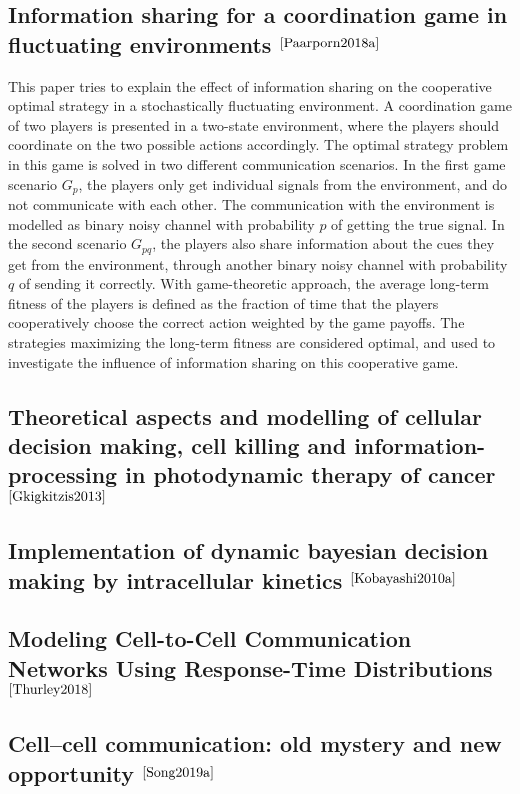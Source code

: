 \documentclass[]{article}
\begin{document}
\subsection{Information sharing for a coordination game in fluctuating environments $ ^{\cite{Paarporn2018a}} $}
This paper tries to explain the effect of information sharing on the cooperative optimal strategy in a stochastically fluctuating environment. A coordination game of two players is presented in a two-state environment, where the players should coordinate on the two possible actions accordingly. The optimal strategy problem in this game is solved in two different communication scenarios. In the first game scenario $ G_{p} $, the players only get individual signals from the environment, and do not communicate with each other. The communication with the environment is modelled as binary noisy channel with probability $ p $ of getting the true signal. In the second scenario $ G_{pq} $, the players also share information about the cues they get from the environment, through another binary noisy channel with probability $ q $ of sending it correctly. With game-theoretic approach, the average long-term fitness of the players is defined as the fraction of time that the players cooperatively choose the correct action weighted by the game payoffs. The strategies maximizing the long-term fitness are considered optimal, and used to investigate the influence of information sharing on this cooperative game.

\subsection{Theoretical aspects and modelling of cellular decision making, cell killing and information-processing in photodynamic therapy of cancer $ ^{\cite{Gkigkitzis2013}} $}


\subsection{Implementation of dynamic bayesian decision making by intracellular kinetics $ ^{\cite{Kobayashi2010a}} $}

\subsection{Modeling Cell-to-Cell Communication Networks Using Response-Time Distributions $ ^{\cite{Thurley2018}} $}

\subsection{Cell–cell communication: old mystery and new opportunity $ ^{\cite{Song2019a}} $}
\end{document}
